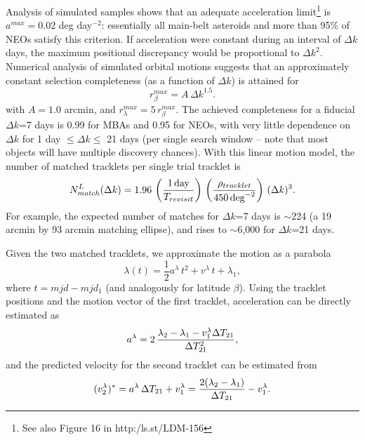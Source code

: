 Analysis of simulated samples shows that an adequate acceleration limit\footnote{See also
Figure 16 in http:/ls.st/LDM-156} is $a^{max}=0.02$ deg day$^{-2}$: essentially
all main-belt asteroids and more than 95\% of NEOs satisfy this criterion. If acceleration
were constant during an interval of $\Delta k$ days, the maximum positional discrepancy
would be proportional to $\Delta k^2$. Numerical analysis of simulated orbital motions
suggests that an approximately constant selection completeness (as a function of $\Delta k$)
is attained for
\begin{equation}
\label{eq:matching1}
                r_\beta^{max} = A \, \Delta k^{1.5}.
\end{equation}
with $A=1.0$ arcmin, and $r_\lambda^{max} = 5 \, r_\beta^{max}$. The achieved completeness for
a fiducial $\Delta k$=7 days is 0.99 for MBAs and 0.95 for NEOs, with very little dependence
on $\Delta k$ for 1 day $\le \Delta k \le$ 21 days (per single search window -- note that most
objects will have multiple discovery chances).  With this linear motion model, the number
of matched tracklets per single trial tracklet is
\begin{equation}
\label{eq:Nmdk2}
   N^{L}_{match}(\Delta k) = 1.96 \, \left({1 \, {\rm day} \over T_{revisit}}\right) \,
                    \left( \rho_{tracklet}  \over 450 \, {\rm deg}^{-2} \right) \, (\Delta k)^3.
\end{equation}
For example,  the expected number of matches for $\Delta k$=7 days is $\sim$224
(a 19 arcmin by 93 arcmin matching ellipse), and rises to $\sim$6,000 for
$\Delta k$=21 days.

Given the two matched tracklets, we approximate the motion as a parabola
\begin{equation}
\label{eq:parabola}
          \lambda(t) = \frac{1}{2}a^\lambda \, t^2 + v^\lambda \, t + \lambda_1,
\end{equation}
where $t = mjd - mjd_1$ (and analogously for latitude $\beta$).  Using the tracklet
positions and the motion vector of the first tracklet, acceleration can be directly
estimated as
\begin{equation}
 \label{eq:accPred}
             a^\lambda = 2 \, {\lambda_2- \lambda_1 - v_1^\lambda \Delta T_{21} \over \Delta T^2_{21}},
\end{equation}
and the predicted velocity for the second tracklet can be estimated from
\begin{equation}
\label{eq:v2cut}
        (v^\lambda_2)^\ast =  a^\lambda \,\Delta T_{21}  + v_1^\lambda =
      {2(\lambda_2- \lambda_1) \over \Delta T_{21}}  - v_1^\lambda.
\end{equation}

